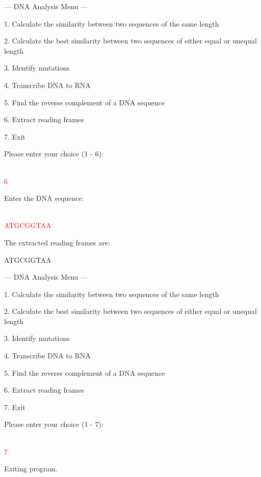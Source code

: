 \begin{sample}

    --- DNA Analysis Menu ---
    
    1. Calculate the similarity between two sequences of the same length
    
    2. Calculate the best similarity between two sequences of either equal or unequal length
    
    3. Identify mutations
    
    4. Transcribe DNA to RNA
    
    5. Find the reverse complement of a DNA sequence
    
    6. Extract reading frames
    
    7. Exit
    
    Please enter your choice (1 - 6): 
    
    \\\textcolor{red}{6}

    Enter the DNA sequence:

    \\\textcolor{red}{ATGCGGTAA}

    The extracted reading frames are:
    
    ATGCGGTAA
    
    --- DNA Analysis Menu ---
    
    1. Calculate the similarity between two sequences of the same length
   
    2. Calculate the best similarity between two sequences of either equal or unequal length
    
    3. Identify mutations
    
    4. Transcribe DNA to RNA
    
    5. Find the reverse complement of a DNA sequence
    
    6. Extract reading frames
    
    7. Exit
    
    Please enter your choice (1 - 7): 
    
    \\\textcolor{red}{7}
    
    Exiting program.
\end{sample}

